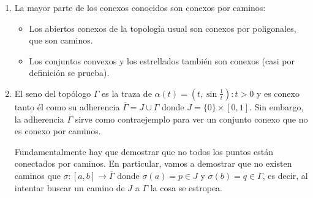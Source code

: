 \begin{ej}
\begin{enumerate}
    \item La mayor parte de los conexos conocidos son conexos por caminos:
    \begin{itemize}
        \item Los abiertos conexos de la topología usual son conexos por poligonales, que son caminos.
        \item Los conjuntos convexos y los estrellados también son conexos (casi por definición se prueba).
    \end{itemize}
    \item El seno del topólogo $\Gamma$ es la traza de $\alpha\left( t \right) = \left( t, \sin\frac{1}{t} \right) : t > 0$ y es conexo tanto él como su adherencia $\overline{\Gamma} = J \cup \Gamma$ donde $J = \{0\} \times \left[ 0, 1 \right]$. Sin embargo, la adherencia $\overline{\Gamma}$ sirve como contraejemplo para ver un conjunto conexo que no es conexo por caminos.
    \begin{demo}
    Fundamentalmente hay que demostrar que no todos los puntos están conectados por caminos. En particular, vamos a demostrar que no existen caminos que $\sigma: \left[ a, b \right] \rightarrow \overline{\Gamma}$ donde $\sigma\left( a \right) = p \in J$ y $\sigma\left( b \right) = q \in \Gamma$, es decir, al intentar buscar un camino de $J$ a $\Gamma$ la cosa se estropea.
    \begin{figure}[H]
        \centering
\end{figure}
\end{demo}
\end{enumerate}
\end{ej}
